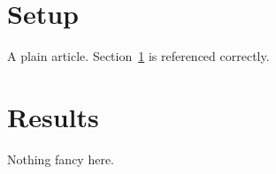 \documentclass{article}
\begin{document}
\section{Setup}\label{sec:setup}
A plain article. Section~\ref{sec:setup} is referenced correctly.
\section{Results}
Nothing fancy here.
\end{document}
